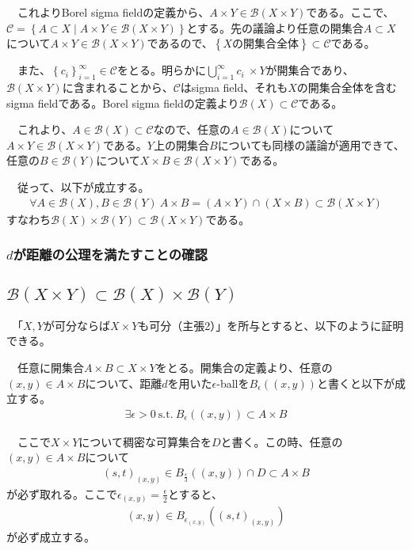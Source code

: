 \documentclass{article}
\begin{document}
　これよりBorel sigma fieldの定義から、$A\times Y \in \mathcal{B}(X \times Y)$である。ここで、$\mathcal{C} = \left\{ A \subset X\mid A\times Y \in \mathcal{B}(X \times Y)\right\}$とする。先の議論より任意の開集合$A \subset X$について$A\times Y \in \mathcal{B}(X \times Y)$であるので、$\left\{ \text{$X$の開集合全体}\right\} \subset \mathcal{C}$である。

　また、$\left\{ c_i \right\}_{i=1}^{\infty} \in \mathcal{C}$をとる。明らかに$\bigcup_{i=1}^{\infty} c_i\ \times Y$が開集合であり、$\mathcal{B}(X\times Y)$に含まれることから、$\mathcal{C}$はsigma field、それも$X$の開集合全体を含むsigma fieldである。Borel sigma fieldの定義より$\mathcal{B}(X) \subset \mathcal{C}$である。

　これより、$A \in \mathcal{B}(X)\subset \mathcal{C}$なので、任意の$A\in \mathcal{B}(X)$について$A\times Y \in \mathcal{B}(X\times Y)$である。$Y$上の開集合$B$についても同様の議論が適用できて、任意の$B\in \mathcal{B}(Y)$について$X\times B\in \mathcal{B}(X\times Y)$である。

　従って、以下が成立する。
\begin{align*}
	\forall A\in\mathcal{B}(X), B \in \mathcal{B}(Y)\ A\times B = (A\times Y) \cap (X\times B) \subset \mathcal{B}(X\times Y)
\end{align*}
すなわち$\mathcal{B}(X)\times\mathcal{B}(Y) \subset \mathcal{B}(X\times Y)$である。

\subsubsection{$d$が距離の公理を満たすことの確認}

\subsection{$\mathcal{B}(X\times Y)\subset \mathcal{B}(X)\times\mathcal{B}(Y)$}
　「$X,Y$が可分ならば$X\times Y$も可分（主張2）」を所与とすると、以下のように証明できる。

　任意に開集合$A\times B \subset X\times Y$をとる。開集合の定義より、任意の$(x,y) \in A\times B$について、距離$d$を用いた$\epsilon$-ballを$B_{\epsilon}((x,y))$と書くと以下が成立する。
\begin{align*}
	\exists \epsilon > 0\ \text{s.t.}\ B_{\epsilon}((x,y)) \subset A\times B
\end{align*}

　ここで$X\times Y$について稠密な可算集合を$D$と書く。この時、任意の$(x,y) \in A\times B$について
\begin{align*}
	(s,t)_{(x,y)} \in B_{\frac{\epsilon}{3}}((x,y)) \cap D \subset A\times B
\end{align*}
が必ず取れる。ここで$\epsilon_{(x,y)} = \frac{\epsilon}{2}$とすると、
\begin{align*}
	(x,y) \in B_{\epsilon_{(x,y)}}((s,t)_{(x,y)})
\end{align*}
が必ず成立する。
\end{document}
